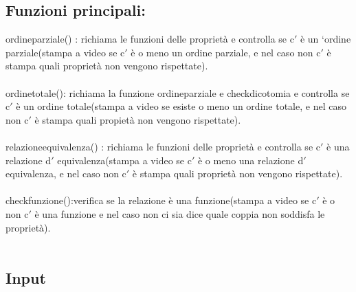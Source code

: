 \documentclass[11pt, a4paper, titlepage, block]{article}
\begin{document}
	\subsection{Funzioni principali:}
	ordine\textunderscore parziale() : richiama le funzioni delle propriet\`a e controlla se c$'$ \`e un ‘ordine parziale(stampa a video se c$'$ \`e o meno un ordine parziale, e nel caso non c$'$ \`e stampa quali propriet\`a non vengono rispettate).\\
	\\
	ordine\textunderscore totale(): richiama la funzione ordine\textunderscore parziale e check\textunderscore dicotomia e controlla se c$'$ \`e un ordine totale(stampa a video se esiste o meno un ordine totale, e nel caso non c$'$ \`e stampa quali propiet\`a non vengono rispettate).\\
	\\
	relazione\textunderscore equivalenza() : richiama le funzioni delle propriet\`a e controlla se c$'$ \`e una relazione d$'$ equivalenza(stampa a video se c$'$ \`e o meno una relazione d$'$ equivalenza, e nel caso non c$'$ \`e stampa quali propriet\`a non vengono rispettate).\\
	\\
	check\textunderscore funzione():verifica se la relazione \`e una funzione(stampa  a video se c$'$ \`e o non c$'$ \`e una funzione e nel caso non ci sia dice quale coppia non soddisfa le propriet\`a).\\
	\\
	\newpage        
	\subsection{Input}
	
\end{document}
